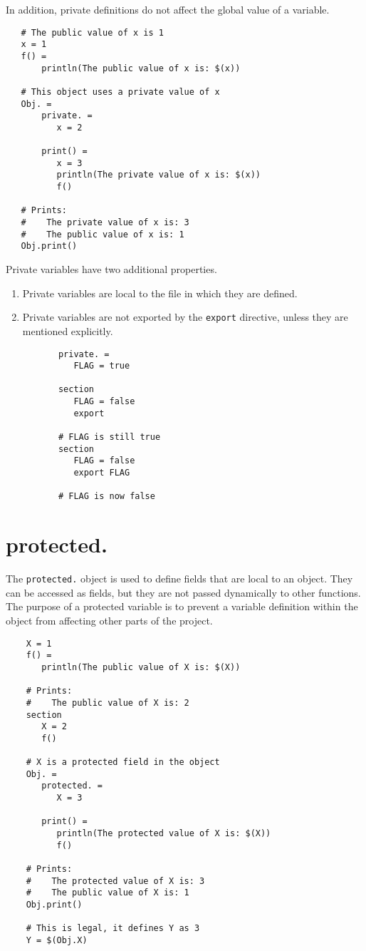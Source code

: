 In addition, private definitions do not affect the global value of a variable.

\begin{verbatim}
   # The public value of x is 1
   x = 1
   f() =
       println(The public value of x is: $(x))

   # This object uses a private value of x
   Obj. =
       private. =
          x = 2

       print() =
          x = 3
          println(The private value of x is: $(x))
          f()

   # Prints:
   #    The private value of x is: 3
   #    The public value of x is: 1
   Obj.print()
\end{verbatim}

Private variables have two additional properties.

\begin{enumerate}
\item Private variables are local to the file in which they are defined.
\item Private variables are not exported by the \verb+export+ directive, unless they are
  mentioned explicitly.

  \begin{verbatim}
       private. =
          FLAG = true

       section
          FLAG = false
          export

       # FLAG is still true
       section
          FLAG = false
          export FLAG

       # FLAG is now false
  \end{verbatim}
\end{enumerate}

\section{protected.}

The \verb+protected.+ object is used to define fields that are local to an object.  They can
be accessed as fields, but they are not passed dynamically to other functions.  The purpose of a
protected variable is to prevent a variable definition within the object from affecting other parts
of the project.

\begin{verbatim}
    X = 1
    f() =
       println(The public value of X is: $(X))

    # Prints:
    #    The public value of X is: 2
    section
       X = 2
       f()

    # X is a protected field in the object
    Obj. =
       protected. =
          X = 3

       print() =
          println(The protected value of X is: $(X))
          f()

    # Prints:
    #    The protected value of X is: 3
    #    The public value of X is: 1
    Obj.print()

    # This is legal, it defines Y as 3
    Y = $(Obj.X)
\end{verbatim}

